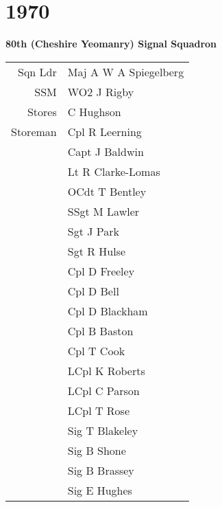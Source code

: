 \chapter*{1970}

\vspace*{10mm}

\begin{center}
  \Large
  \textbf{80th (Cheshire Yeomanry) Signal Squadron}
\end{center}

\vspace*{5mm}

\begin{center}
  \begin{tabular}{rl}
    Sqn Ldr & Maj A W A Spiegelberg \\
    SSM & WO2 J Rigby \\
    Stores & C Hughson \\
    Storeman & Cpl R Leerning \\
    & Capt J Baldwin \\
    & Lt R Clarke-Lomas \\
    & OCdt T Bentley \\
    & SSgt M Lawler \\
    & Sgt J Park \\
    & Sgt R Hulse \\
    & Cpl D Freeley \\
    & Cpl D Bell \\
    & Cpl D Blackham \\
    & Cpl B Baston \\
    & Cpl T Cook \\
    & LCpl K Roberts \\
    & LCpl C Parson \\
    & LCpl T Rose \\
    & Sig T Blakeley \\
    & Sig B Shone \\
    & Sig B Brassey \\
    & Sig E Hughes \\
  \end{tabular}
\end{center}

